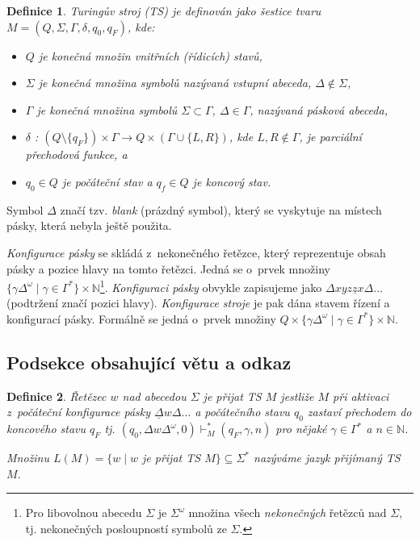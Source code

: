 \documentclass[11pt, a4paper,twocolumn]{article}
\def \fnote {Pro libovolnou abecedu $\Sigma$ je $\Sigma^\omega$ množina všech \emph{nekonečných} řetězců nad $\Sigma$, tj. nekonečných posloupností symbolů ze $\Sigma$.}
\newtheorem{definition}{Definice}
\begin{document}
\begin{definition} \label{def:def1}
\textnormal{Turingův stroj} (TS) je definován jako šestice tvaru $M = (Q, \Sigma, \Gamma, \delta, q_0, q_F)$, kde:
\begin{itemize}
  \setlength\itemsep{0.05em}
  \item $Q$ je konečná množin \textnormal{vnitřních (řídicích) stavů},
  \item $\Sigma$ je konečná množina symbolů nazývaná \textnormal{vstupní abeceda}, $\Delta \notin \Sigma $, 
  \item $\Gamma$ je konečná množina symbolů $\Sigma \subset \Gamma$, $\Delta \in \Gamma$, nazývaná \textnormal{pásková abeceda},
  \item $\delta$ : $(Q \setminus \{q_F\}) \times \Gamma \to Q \times (\Gamma \cup \{L,R\})$, kde $L,R \notin \Gamma$, je parciální \textnormal{přechodová funkce}, a
  \item $q_0\in Q$ je \textnormal{počáteční stav} a $q_f \in Q$ je \textnormal{koncový stav}.
\end{itemize}
\end{definition}

Symbol $\Delta$ značí tzv. \emph{blank} (prázdný symbol), který se vyskytuje na místech pásky, která nebyla ještě použita.

\emph{Konfigurace pásky} se skládá z~nekonečného řetězce, který reprezentuje obsah pásky a pozice hlavy na tomto řetězci. Jedná se o~prvek množiny ${\{ \gamma \Delta^\omega \mid \gamma \in \Gamma^\ast \} \times \mathbb{N}}$\footnote{\fnote}.
\emph{Konfiguraci pásky} obvykle zapisujeme jako ${\Delta xyz \underline{z}x \Delta\ldots}$ (podtržení značí pozici hlavy). \emph{Konfigurace stroje} je pak dána stavem řízení a konfigurací pásky. Formálně se jedná o~prvek množiny ${Q \times \{\gamma \Delta^\omega \mid \gamma \in \Gamma^\ast \} \times \mathbb{N}}$.

\subsection{Podsekce obsahující větu a odkaz}
\begin{definition} \label{def:def2}
\textnormal{Řetězec $w$ nad abecedou $\Sigma$ je přijat TS $M$} jestliže $M$ při aktivaci z~počáteční konfigurace pásky
$\underline{\Delta}w\Delta\ldots$ a počátečního stavu $q_0$ zastaví přechodem do koncového stavu $q_F$ tj. $(q_0,\Delta w\Delta^\omega,0)  \vdash_M^* (q_F,\gamma,n)$ pro nějaké $\gamma \in \Gamma^\ast  $ a $n \in \mathbb{N}$.

Množinu $L(M) = \{w\!\mid\! w$ je přijat TS $M\}  \subseteq \Sigma^\ast $ na\-zý\-vá\-me jazyk přijímaný \textnormal{TS} $M$.
\end{definition}
\end{document}
